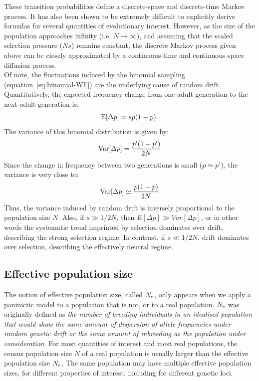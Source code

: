 These {transition} probabilities define a discrete-space and discrete-time Markov process.
It has also been shown to be extremely difficult to explicitly derive formulas for several quantities of evolutionary interest.
However, as the size of the population approaches infinity (i.e. $ N \to \infty$), and assuming that the scaled selection pressure ($N s $) remains constant, the discrete Markov process given above can be closely approximated by a continuous-time and continuous-space diffusion process.\\

Of note, the fluctuations induced by the binomial sampling (equation~\ref{eq:binomial-WF}) are the underlying cause of random drift.
Quantitatively, the expected frequency change from one adult generation to the next adult generation is:
\begin{equation}
    \operatorname{\mathbb{E}}[\Delta p] = s p (1-p).
\end{equation}
The variance of this binomial distribution is given by:
\begin{equation}
    \operatorname{\textrm{Var}}[\Delta p] = \frac{p' (1-p')}{2N}
\end{equation}
Since the change in frequency between two generations is small ($p \simeq p'$), the variance is very close to:
\begin{equation}
    \operatorname{\textrm{Var}}[\Delta p] \simeq \frac{p(1-p)}{2N}
\end{equation}
Thus, the variance induced by random drift is inversely proportional to the population size $N$.
Also, if $s \gg 1/2N$, then $E[\Delta p] \gg Var[\Delta p]$, or in other words the systematic trend imprinted by selection dominates over drift, describing the strong selection regime.
In contrast, if $s \ll 1 / 2N$, drift dominates over selection, describing the effectively neutral regime.

\subsection{Effective population size}

The notion of effective population size, called $N_{\textrm{e}}$, only appears when we apply a panmictic model to a population that is not, or to a real population.
$N_{\textrm{e}}$ was originally defined as \textit{the number of breeding individuals in an idealised population that would show the same amount of dispersion of allele frequencies under random genetic drift or the same amount of inbreeding as the population under consideration}.
For most quantities of interest and most real populations, the census population size $N$ of a real population is usually larger than the effective population size $N_{\textrm{e}}$.
The same population may have multiple effective population sizes, for different properties of interest, including for different genetic loci.

